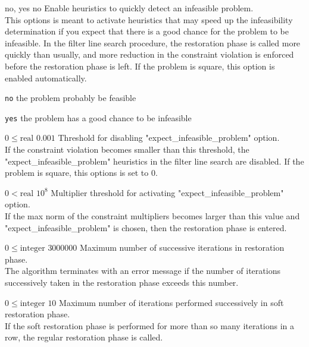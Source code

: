 %
{\ttfamily no, yes}%
{no}%
{Enable heuristics to quickly detect an infeasible problem.\\
This options is meant to activate heuristics that may speed up the infeasibility determination if you expect that there is a good chance for the problem to be infeasible.  In the filter line search procedure, the restoration phase is called more quickly than usually, and more reduction in the constraint violation is enforced before the restoration phase is left. If the problem is square, this option is enabled automatically.}%
{\begin{list}{}{
\setlength{\parsep}{0em}
\setlength{\leftmargin}{5ex}
\setlength{\labelwidth}{2ex}
\setlength{\itemindent}{0ex}
\setlength{\topsep}{0pt}}
\item[\texttt{no}] the problem probably be feasible
\item[\texttt{yes}] the problem has a good chance to be infeasible
\end{list}
}

%
{$0\leq\textrm{real}$}%
{$0.001$}%
{Threshold for disabling "expect\_infeasible\_problem" option.\\
If the constraint violation becomes smaller than this threshold, the "expect\_infeasible\_problem" heuristics in the filter line search are disabled. If the problem is square, this options is set to 0.}%
{}

%
{$0<\textrm{real}$}%
{$10^{  8}$}%
{Multiplier threshold for activating "expect\_infeasible\_problem" option.\\
If the max norm of the constraint multipliers becomes larger than this value and "expect\_infeasible\_problem" is chosen, then the restoration phase is entered.}%
{}

%
{$0\leq\textrm{integer}$}%
{$3000000$}%
{Maximum number of successive iterations in restoration phase.\\
The algorithm terminates with an error message if the number of iterations successively taken in the restoration phase exceeds this number.}%
{}

%
{$0\leq\textrm{integer}$}%
{$10$}%
{Maximum number of iterations performed successively in soft restoration phase.\\
If the soft restoration phase is performed for more than so many iterations in a row, the regular restoration phase is called.}%
{}

